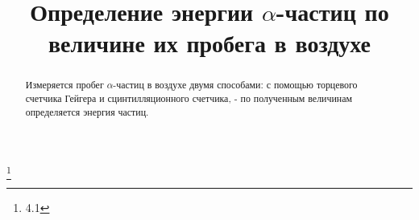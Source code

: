 


\title{Определение энергии $\alpha$-частиц по величине их пробега в воздухе}
\thanks{4.1}



\begin{abstract}
Измеряется пробег $\alpha$-частиц в воздухе двумя способами: с помощью торцевого счетчика Гейгера и сцинтилляционного счетчика, - по полученным величинам определяется энергия частиц.

\end{abstract}


\maketitle

